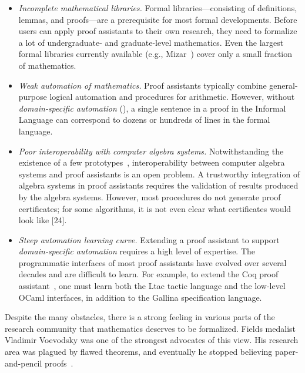 \documentclass[11pt]{amsart}  %
\begin{document}
\begin{itemize}
\item \emph{Incomplete mathematical libraries.} Formal libraries---consisting of  definitions, lemmas, and proofs---are a prerequisite for most formal developments. Before users can apply proof assistants to their own research, they need to formalize a lot of undergraduate- and graduate-level mathematics. Even the largest formal libraries currently available (e.g., Mizar~\cite{mizar:2005,gonthier:2017}) cover only a small fraction of mathematics.

\item \emph{Weak automation of mathematics.} Proof assistants typically combine general-purpose logical automation and procedures for arithmetic. However, without \textsl{domain-specific automation} (\dsa), a single sentence in a proof in the Informal Language can correspond to dozens or hundreds of lines in the formal language.

\item \emph{Poor interoperability with computer algebra systems.} Notwithstanding the existence of a few prototypes~\cite{MR1730396,MR1656868}, interoperability between computer algebra systems and proof assistants is an open problem. A trustworthy integration of algebra systems in proof assistants requires the validation of results produced by the algebra systems. However, most procedures do not generate proof certificates; for some algorithms, it is not even clear what certificates would look
  like [24]. 

\item \emph{Steep automation learning curve.}  Extending a proof
  assistant to support \textsl{domain-specific automation} requires a high level
  of expertise. The programmatic interfaces of most proof assistants have
  evolved over several decades and are difficult to learn. For example,
  to extend the Coq proof assistant~\cite{CoqManual:2017}, one must learn both the Ltac tactic language and the low-level OCaml interfaces, in addition to the Gallina specification language.
\end{itemize}

  Despite the many obstacles, there is a strong
  feeling in various parts of the research community that mathematics deserves to
  be formalized. Fields medalist Vladimir Voevodsky was one of
  the strongest advocates of this view. His research area was plagued by flawed theorems, and eventually he stopped believing paper-and-pencil proofs~\cite{rehmeyer:2013}.
\end{document}

